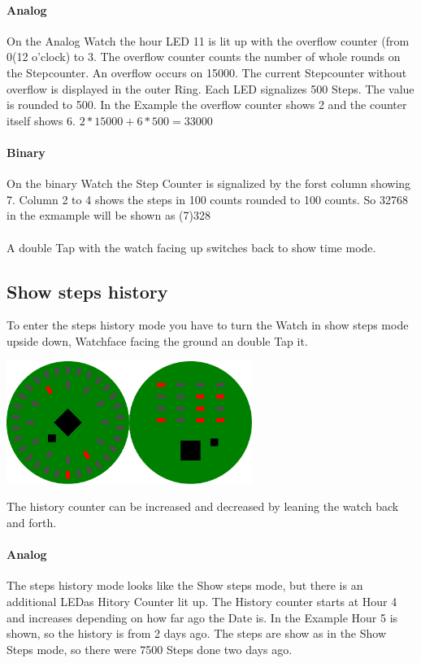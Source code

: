 \paragraph{Analog}
On the Analog Watch the hour LED 11 is lit up with the overflow counter (from 0(12 o'clock) to 3. The overflow counter counts the number of whole rounds on the Stepcounter. An overflow occurs on 15000. The current Stepcounter without overflow is displayed in the outer Ring. Each LED signalizes 500 Steps. The value is rounded to 500.
In the Example the overflow counter shows 2 and the counter itself shows 6.
$2*15000+6*500 = 33000$
\paragraph{Binary}
On the binary Watch the Step Counter is signalized by the forst column showing 7. Column 2 to 4 shows the steps in 100 counts rounded to 100 counts. So 32768 in the exmample will be shown as (7)328\\
\\
A double Tap with the watch facing up switches back to show time mode.

\subsection{Show steps history}
To enter the steps history mode you have to turn the Watch in show steps mode upside down, Watchface facing the ground an double Tap it.
\begin{center}
\includegraphics[width=0.6\textwidth]{../Graphics/ShowStepsHist_2Days_ago_7500}
\end{center}
The history counter can be increased and decreased by leaning the watch back and forth.
\paragraph{Analog} 
The steps history mode looks like the Show steps mode, but there is an additional LEDas Hitory Counter lit up. The History counter starts at Hour 4 and increases depending on how far ago the Date is. In the Example Hour 5 is shown, so the history is from 2 days ago. The steps are show as in the Show Steps mode, so there were 7500 Steps done two days ago.
